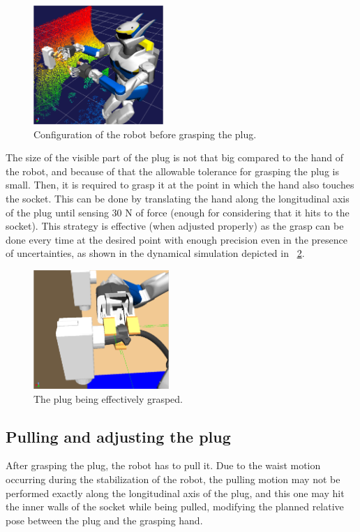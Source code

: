 		\begin{figure}[t]
			\centering
			\includegraphics[height = 4.5cm]{img/PreCloseHand}
			\caption{Configuration of the robot before grasping the plug.}
			\label{fig:PreCloseHand}
		\end{figure}
		
		The size of the visible part of the plug is not that big compared to the hand of the robot,
		and because of that the allowable tolerance for grasping the plug is small.
		Then, it is required to grasp it at the point in which the hand also touches the socket.
		This can be done by translating the hand along the longitudinal axis of the plug until sensing
		30 N of force (enough for considering that it hits to the socket).
		This strategy is effective (when adjusted properly) as the grasp can be done every time at the
		desired point with enough precision even in the presence of uncertainties, as shown in the dynamical
		simulation depicted	in \figurename~\ref{fig:GraspPlug}.
		
		\begin{figure}[b]
			\centering
			\includegraphics[height = 4.5cm]{img/GraspPlug}
			\caption{The plug being effectively grasped.}
			\label{fig:GraspPlug}
		\end{figure}
		
	\subsection{Pulling and adjusting the plug}
		
		After grasping the plug, the robot has to pull it.
		Due to the waist motion occurring during the stabilization of the robot, the pulling motion may not
		be performed exactly along the longitudinal axis of the plug, and this one may hit the inner walls
		of the socket while being pulled, modifying the planned relative pose between the plug and the
		grasping hand.
		
